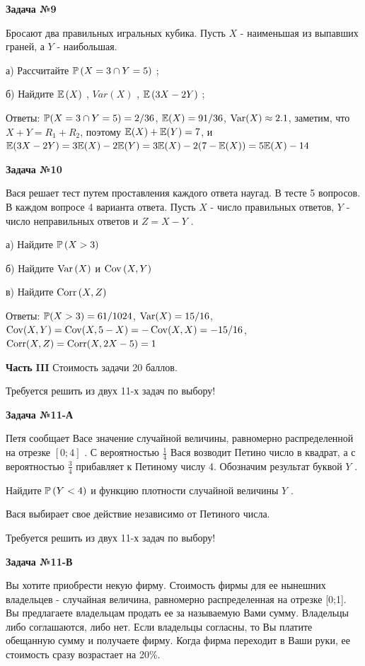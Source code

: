 \documentclass[12pt, a4paper]{article}\usepackage[]{graphicx}\usepackage[]{color}
\begin{document}
	{\bf Задача №9}

	Бросают два правильных игральных кубика. Пусть  $X$  - наименьшая из выпавших граней, а  $Y$  - наибольшая.

	а)	Рассчитайте  $\P\left(X=3\cap Y=5\right)$ ;

	б)	Найдите  $\E\left(X\right)$ ,  $Var\left(X\right)$ ,  $\E\left(3X-2Y\right)$ ;

	Ответы: $\P(X=3 \cap Y=5)=2/36$, $\E(X)=91/36$, $\Var(X)\approx 2.1$, заметим, что $X+Y=R_1+R_2$, поэтому $\E(X)+\E(Y)=7$, и $\E(3X-2Y)=3\E(X)-2\E(Y)=3\E(X)-2(7-\E(X))=5\E(X)-14$

	{\bf Задача №10}

	Вася решает тест путем проставления каждого ответа наугад. В тесте 5 вопросов. В каждом вопросе 4 варианта ответа. Пусть  $X$  - число правильных ответов,  $Y$  - число неправильных ответов и  $Z=X-Y$ .

	а)	Найдите  $\P\left(X>3\right)$

	б)	Найдите  $\Var\left(X\right)$  и  $\Cov\left(X,Y\right)$

	в)	Найдите  $\Corr\left(X,Z\right)$


	Ответы: $\P(X>3)=61/1024$, $\Var(X)=15/16$, $\Cov(X,Y)=\Cov(X,5-X)=-\Cov(X,X)=-15/16$, $\Corr(X,Z)=\Corr(X,2X-5)=1$

	{\bf Часть }{\bf III} Стоимость задачи 20 баллов.

	Требуется решить {\bf {}} из двух 11-х задач по выбору!


	{\bf Задача №11}{\bf -А}

	Петя сообщает Васе значение случайной величины, равномерно распределенной на отрезке  $[0;4]$ . С вероятностью  $\frac{1}{4} $  Вася возводит Петино число в квадрат, а с вероятностью  $\frac{3}{4} $  прибавляет к Петиному числу 4. Обозначим результат буквой  $Y$ .

	Найдите  $\P\left(Y<4\right)$  и функцию плотности случайной величины  $Y$ .

	Вася выбирает свое действие независимо от Петиного числа.

	Требуется решить {\bf {}} из двух 11-х задач по выбору!

	{\bf Задача №11}{\bf -В}

	Вы хотите приобрести некую фирму. Стоимость фирмы для ее нынешних владельцев - случайная величина, равномерно распределенная на отрезке [0;1]. Вы предлагаете владельцам продать ее за называемую Вами сумму. Владельцы либо соглашаются, либо нет. Если владельцы согласны, то Вы платите обещанную сумму и получаете фирму. Когда фирма переходит в Ваши руки, ее стоимость сразу возрастает на 20\%.
\end{document}
